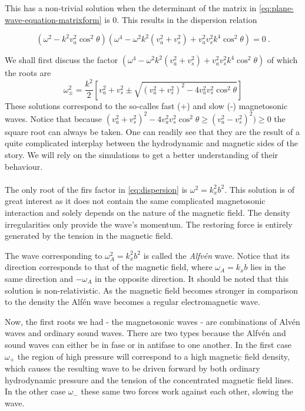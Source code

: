 This has a non-trivial solution when the determinant of the matrix in \cref{eq:plane-wave-equation-matrixform} is $0$. This results in the dispersion relation

\begin{equation}
\label{eq:dispersion}
(\omega^2 - k^2 v_a^2\cos^2\theta)\left( \omega^4 - \omega^2k^2(v_a^2+v_s^2) + v_a^2 v_s^2k^4\cos^2\theta  \right) = 0 \ .
\end{equation}


We shall first discuss the factor $\left( \omega^4 - \omega^2k^2(v_a^2+v_s^2) + v_a^2 v_s^2k^4\cos^2\theta  \right)$
of which the roots are
\begin{equation}
	\omega_{\pm}^2 = \frac{k^2}{2} \left[ v_a^2+v_s^2 \pm \sqrt{(v_a^2+v_s^2)^2-4v_a^2v_s^2\cos^2\theta} \right] 	
	\label{eq:magnetosonic-phase-speed}
\end{equation}
These solutions correspond to the so-calles fast (+) and slow (-) magnetosonic waves. 
Notice that because $(v_a^2+v_s^2)^2-4v_a^2v_s^2\cos^2\theta \geq (v_a^2-v_s^2)^2) \geq 0$ the square root can always be taken.
One can readily see that they are the result of a quite complicated interplay between the hydrodynamic and magnetic sides of the story. 
We will rely on the simulations to get a better understanding of their behaviour.\\
\\
The only root of the firs factor in \cref{eq:dispersion} is $ \omega^2 = k_x^2 b^2 $. 
This solution is of great interest as it does not contain the same complicated magnetosonic interaction and solely depends on the nature of the magnetic field. 
The density irregularities only provide the wave's momentum. The restoring force is entirely generated by the tension in the magnetic field.

The wave corresponding to $\omega_A^2 = k_x^2 b^2$ is called the \textit{Alfvén} wave. 
Notice that its direction corresponds to that of the magnetic field, where $\omega_A = k_x b$ lies in the same direction and $-\omega_A$ in the opposite direction. 
It should be noted that this solution is non-relativistic. 
As the magnetic field becomes stronger in comparison to the density the Alfén wave becomes a regular electromagnetic wave.

Now, the first roots we had - the magnetosonic waves - are combinations of Alvén waves and ordinary sound waves. 
There are two types because the Alfvén and sound waves can either be in fase or in antifase to one another. 
In the first case $\omega_+$ the region of high pressure will correspond to a high magnetic field density, which causes the resulting wave to be driven forward by both ordinary hydrodynamic pressure and the tension of the concentrated magnetic field lines. 
In the other case $\omega_-$ these same two forces work against each other, slowing the wave.

